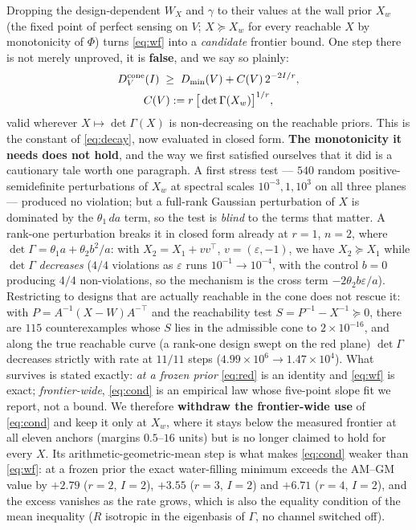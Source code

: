 Dropping the design-dependent $W_X$ and $\gamma$ to their values at the wall
prior $X_w$ (the fixed point of perfect sensing on $V$; $X\succeq X_w$ for every
reachable $X$ by monotonicity of $\Phi$) turns \eqref{eq:wf} into a
\emph{candidate} frontier bound. One step there is not merely unproved, it is
\textbf{false}, and we say so plainly:
\begin{equation}
 \begin{gathered}
 D^{\rm cone}_V(I)\;\ge\;D_{\min}(V)+C(V)\,2^{-2I/r},\\
 C(V):=r\,\big[\det\Gamma(X_w)\big]^{1/r},
 \end{gathered}
\label{eq:cond}
\end{equation}
valid wherever $X\mapsto\det\Gamma(X)$ is non-decreasing on the reachable
priors. This is the constant of \eqref{eq:decay}, now evaluated in closed form.
\textbf{The monotonicity it needs does not hold}, and the way we first satisfied
ourselves that it did is a cautionary tale worth one paragraph. A first stress
test --- $540$ random positive-semidefinite perturbations of $X_w$ at spectral
scales $10^{-3},1,10^{3}$ on all three planes --- produced no violation; but a
full-rank Gaussian perturbation of $X$ is dominated by the $\theta_1\,da$ term,
so the test is \emph{blind} to the terms that matter. A rank-one perturbation
breaks it in closed form already at $r=1$, $n=2$, where
$\det\Gamma=\theta_1a+\theta_2b^2/a$: with $X_2=X_1+vv^{\top}$,
$v=(\varepsilon,-1)$, we have $X_2\succeq X_1$ while $\det\Gamma$ \emph{decreases}
($4/4$ violations as $\varepsilon$ runs $10^{-1}\to10^{-4}$, with the control
$b=0$ producing $4/4$ non-violations, so the mechanism is the cross term
$-2\theta_2b\varepsilon/a$). Restricting to designs that are actually reachable
in the cone does not rescue it: with $P=A^{-1}(X-W)A^{-\top}$ and the
reachability test $S=P^{-1}-X^{-1}\succeq0$, there are $115$ counterexamples
whose $S$ lies in the admissible cone to $2\times10^{-16}$, and along the true
reachable curve (a rank-one design swept on the red plane) $\det\Gamma$
decreases strictly with rate at $11/11$ steps ($4.99\times10^{6}\to1.47\times10^{4}$).
What survives is stated exactly: \emph{at a frozen prior} \eqref{eq:red} is an
identity and \eqref{eq:wf} is exact; \emph{frontier-wide}, \eqref{eq:cond} is
an empirical law whose five-point slope fit we report, not a bound. We therefore
\textbf{withdraw the frontier-wide use} of \eqref{eq:cond} and keep it only at
$X_w$, where it stays below the measured frontier at all eleven anchors
(margins $0.5$--$16$ units) but is no longer claimed to hold for every $X$.
Its arithmetic-geometric-mean step is what makes
\eqref{eq:cond} weaker than \eqref{eq:wf}: at a frozen prior the exact
water-filling minimum exceeds the $\mathrm{AM}$--$\mathrm{GM}$ value by
$+2.79$ ($r=2$, $I=2$), $+3.55$ ($r=3$, $I=2$) and $+6.71$ ($r=4$, $I=2$), and
the excess vanishes as the rate grows, which is also the equality condition of
the mean inequality ($R$ isotropic in the eigenbasis of $\Gamma$, no channel
switched off). 

